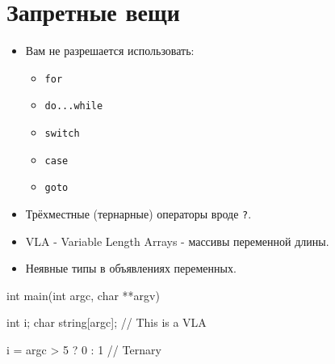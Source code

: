 \documentclass{42-ru}
\begin{document}
    \newpage


    \section{Запретные вещи}

        \begin{itemize}

            \item Вам не разрешается использовать:

                \begin{itemize}

                    \item \texttt{for}
                    \item \texttt{do...while}
                    \item \texttt{switch}
                    \item \texttt{case}
                    \item \texttt{goto}

                \end{itemize}

            \item Трёхместные (тернарные) операторы вроде \texttt{?}.

            \item VLA - Variable Length Arrays - массивы переменной длины.

            \item Неявные типы в объявлениях переменных.

        \end{itemize}
        \begin{42ccode}
    int main(int argc, char **argv)
    {
        int     i;
        char    string[argc]; // This is a VLA

        i = argc > 5 ? 0 : 1 // Ternary
    }
        \end{42ccode}

    \newpage

\end{document}
